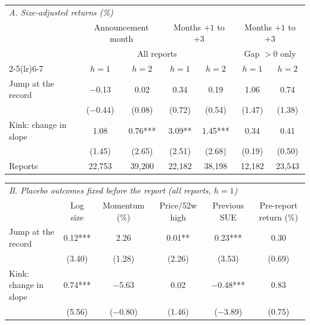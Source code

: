 \begin{tabular}{lcccccc}
\toprule
\multicolumn{7}{l}{\textit{A. Size-adjusted returns (\%)}}\\
 & \multicolumn{2}{c}{Announcement month} & \multicolumn{2}{c}{Months $+1$ to $+3$} & \multicolumn{2}{c}{Months $+1$ to $+3$}\\
 & \multicolumn{4}{c}{All reports} & \multicolumn{2}{c}{Gap $>0$ only}\\
\cmidrule(lr){2-5}\cmidrule(lr){6-7}
 & $h=1$ & $h=2$ & $h=1$ & $h=2$ & $h=1$ & $h=2$\\
\midrule
Jump at the record & \ensuremath{-}0.13 & 0.02 & 0.34 & 0.19 & 1.06 & 0.74\\
 & (\ensuremath{-}0.44) & (0.08) & (0.72) & (0.54) & (1.47) & (1.38)\\[1pt]
Kink: change in slope & 1.08 & 0.76*** & 3.09** & 1.45*** & 0.34 & 0.41\\
 & (1.45) & (2.65) & (2.51) & (2.68) & (0.19) & (0.50)\\[1pt]
Reports & 22,753 & 39,200 & 22,182 & 38,198 & 12,182 & 23,543\\
\bottomrule
\end{tabular}

\vspace{6pt}
\begin{tabular}{lccccc}
\toprule
\multicolumn{6}{l}{\textit{B. Placebo outcomes fixed before the report (all reports, $h=1$)}}\\
 & Log size & Momentum (\%) & Price/52w high & Previous SUE & Pre-report return (\%)\\
\midrule
Jump at the record & 0.12*** & 2.26 & 0.01** & 0.23*** & 0.30\\
 & (3.40) & (1.28) & (2.26) & (3.53) & (0.69)\\[1pt]
Kink: change in slope & 0.74*** & \ensuremath{-}5.63 & 0.02 & \ensuremath{-}0.48*** & 0.83\\
 & (5.56) & (\ensuremath{-}0.80) & (1.46) & (\ensuremath{-}3.89) & (0.75)\\[1pt]
\bottomrule
\end{tabular}
